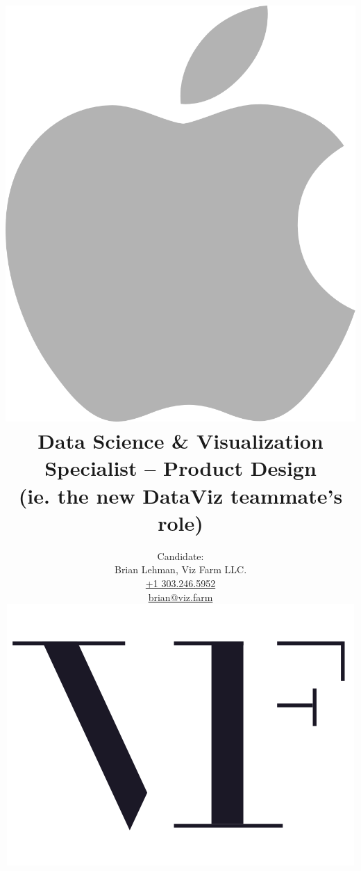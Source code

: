\documentclass[11pt]{article}
\begin{document}
\title{\includegraphics[scale=0.075]{apple logo grey.png}\\Data Science \& Visualization Specialist -- Product Design\\(ie. the new DataViz teammate's role)}

\author{Candidate:\\Brian Lehman, Viz Farm LLC. \\
\href{tel:+13032465952}{+1 303.246.5952}\\
\href{mailto:brian@viz.farm}{brian@viz.farm}\\ 
\includegraphics[scale=0.2]{viz farm logo black on white.png}\\
}
\maketitle 
\tableofcontents
\end{document}
